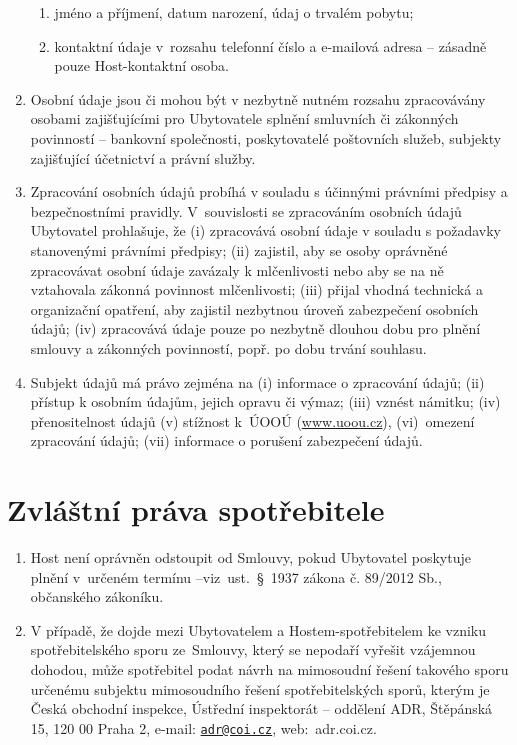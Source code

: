 \documentclass[a4paper]{scrartcl}
\begin{document}
\begin{enumerate}
\begin{enumerate}
          \item
                jméno a příjmení, datum narození, údaj o trvalém pobytu;
          \item
                kontaktní údaje v~rozsahu telefonní číslo a e-mailová adresa --
                zásadně pouze Host-kontaktní osoba.
        \end{enumerate}
  \item
        Osobní údaje jsou či mohou být v nezbytně nutném rozsahu
        zpracovávány osobami zajišťujícími pro Ubytovatele splnění smluvních
        či zákonných povinností -- bankovní společnosti, poskytovatelé
        poštovních služeb, subjekty zajišťující účetnictví a právní služby.
  \item
        Zpracování osobních údajů probíhá v souladu s účinnými právními
        předpisy a bezpečnostními pravidly. V~souvislosti se zpracováním
        osobních údajů Ubytovatel prohlašuje, že (i) zpracovává osobní údaje
        v souladu s požadavky stanovenými právními předpisy; (ii) zajistil,
        aby se osoby oprávněné zpracovávat osobní údaje zavázaly k
        mlčenlivosti nebo aby se na ně vztahovala zákonná povinnost
        mlčenlivosti; (iii) přijal vhodná technická a organizační opatření,
        aby zajistil nezbytnou úroveň zabezpečení osobních údajů; (iv)
        zpracovává údaje pouze po nezbytně dlouhou dobu pro plnění smlouvy a
        zákonných povinností, popř. po dobu trvání souhlasu.
  \item
        Subjekt údajů má právo zejména na (i) informace o zpracování údajů;
        (ii) přístup k osobním údajům, jejich opravu či výmaz; (iii) vznést
        námitku; (iv) přenositelnost údajů (v) stížnost k~ÚOOÚ
        (\href{http://www.uoou.cz/}{www.uoou.cz}), (vi)~omezení zpracování
        údajů; (vii) informace o porušení zabezpečení údajů.
\end{enumerate}

\section{Zvláštní práva spotřebitele}
\begin{enumerate}

  \item
        Host není oprávněn odstoupit od Smlouvy, pokud Ubytovatel poskytuje
        plnění v~určeném termínu --viz~ust.~§~1937 zákona č. 89/2012 Sb.,
        občanského zákoníku.
  \item
        V případě, že dojde mezi Ubytovatelem a Hostem-spotřebitelem ke
        vzniku spotřebitelského sporu ze~Smlouvy, který se nepodaří vyřešit
        vzájemnou dohodou, může spotřebitel podat návrh na mimosoudní řešení
        takového sporu určenému subjektu mimosoudního řešení
        spotřebitelských sporů, kterým je Česká obchodní inspekce, Ústřední
        inspektorát -- oddělení ADR, Štěpánská 15, 120 00 Praha 2, e-mail:
        \href{mailto:adr@coi.cz}{\nolinkurl{adr@coi.cz}}, web:~adr.coi.cz.
\end{enumerate}
\end{document}
